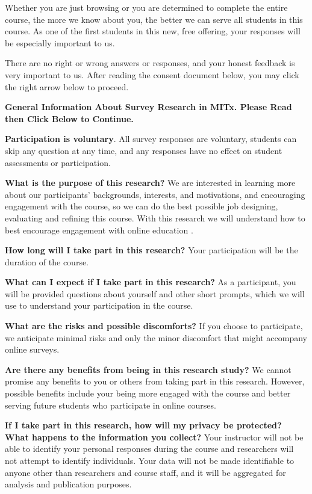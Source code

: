 \documentclass[pdftex, brazil, 12pt, twoside]{article}
\begin{document}
Whether you are just browsing or you are determined to complete the entire course, the more we know about you, the better we can serve all students in this course. As one of the first students in this new, free offering, your responses will be especially important to us. 

There are no right or wrong answers or responses, and your honest feedback is very important to us.  After reading the consent document below, you may click the right arrow below to proceed. 

\textbf{General Information About Survey Research in MITx. Please Read then Click Below to Continue.}

\textbf{Participation is voluntary}.
All survey responses are voluntary, students can skip any question at any time, and any responses have no effect on student assessments or participation. 

\textbf{What is the purpose of this research?}
We are interested in learning more about our participants’ backgrounds, interests, and motivations, and encouraging engagement with the course, so we can do the best possible job designing, evaluating and refining this course. With this research we will understand how to best encourage engagement with online education . 

\textbf{How long will I take part in this research?}
Your participation will be the duration of the course.

\textbf{What can I expect if I take part in this research?}
As a participant, you will be provided questions about yourself and other short prompts, which we will use to understand your participation in the course.  
 
\textbf{What are the risks and possible discomforts?}
If you choose to participate, we anticipate minimal risks and only the minor discomfort that might accompany online surveys. 

\textbf{Are there any benefits from being in this research study? }
We cannot promise any benefits to you or others from taking part in this research. However, possible benefits include your being more engaged with the course and better serving future students who participate in online courses. 

\textbf{If I take part in this research, how will my privacy be protected? What happens to the information you collect?}
Your instructor will not be able to identify your personal responses during the course and researchers will not attempt to identify individuals.  Your data will not be made identifiable to anyone other than researchers and course staff, and it will be aggregated for analysis and publication purposes. 
\end{document}

